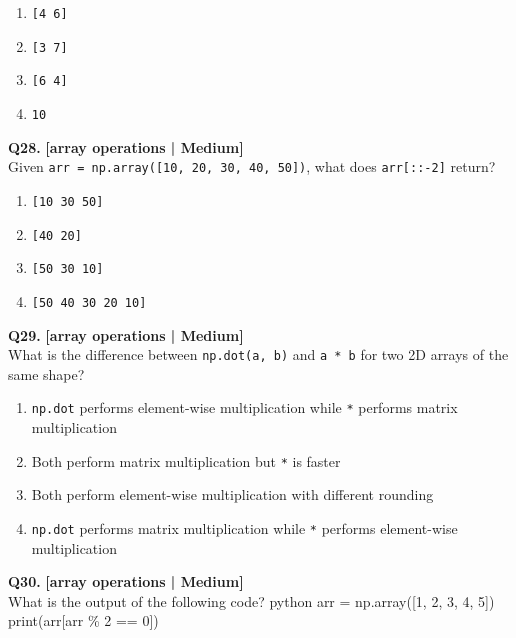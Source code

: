 \begin{enumerate}[label=(\alph*),topsep=2pt,itemsep=1pt,partopsep=0pt,parsep=0pt]
    \item \relax \texttt{[4 6]}
    \item \relax \texttt{[3 7]}
    \item \relax \texttt{[6 4]}
    \item \relax \texttt{10}
\end{enumerate}
\vspace{2mm}

\noindent\textbf{Q28.} \hfill {\small\color{LPUOrange}\textbf{[array operations | Medium]}}\\[2pt]
Given \texttt{arr = np.array([10, 20, 30, 40, 50])}, what does \texttt{arr[::-2]} return?

\begin{enumerate}[label=(\alph*),topsep=2pt,itemsep=1pt,partopsep=0pt,parsep=0pt]
    \item \relax \texttt{[10 30 50]}
    \item \relax \texttt{[40 20]}
    \item \relax \texttt{[50 30 10]}
    \item \relax \texttt{[50 40 30 20 10]}
\end{enumerate}
\vspace{2mm}

\noindent\textbf{Q29.} \hfill {\small\color{LPUOrange}\textbf{[array operations | Medium]}}\\[2pt]
What is the difference between \texttt{np.dot(a, b)} and \texttt{a * b} for two 2D arrays of the same shape?

\begin{enumerate}[label=(\alph*),topsep=2pt,itemsep=1pt,partopsep=0pt,parsep=0pt]
    \item \relax \texttt{np.dot} performs element-wise multiplication while \texttt{*} performs matrix multiplication
    \item \relax Both perform matrix multiplication but \texttt{*} is faster
    \item \relax Both perform element-wise multiplication with different rounding
    \item \relax \texttt{np.dot} performs matrix multiplication while \texttt{*} performs element-wise multiplication
\end{enumerate}
\vspace{2mm}

\noindent\textbf{Q30.} \hfill {\small\color{LPUOrange}\textbf{[array operations | Medium]}}\\[2pt]
What is the output of the following code? 
 python 
 arr = np.array([1, 2, 3, 4, 5]) 
 print(arr[arr \% 2 == 0])

